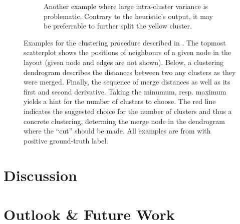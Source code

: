 \documentclass[
	fontsize=10pt, %
	twoside=false, %
	secnumdepth=1, %
  toc=indentunnumbered %
]{kaobook}
\begin{document}
\begin{figure}[h]
\begin{subfigure}{0.48\linewidth}
        \caption{Another example where large intra-cluster variance is
          problematic. Contrary to the heuristic's output, it may be preferrable
          to further split the yellow cluster.}
      \end{subfigure}
      \caption[
      Example outputs of the heuristic for attaching edges after node
      duplication has been decided.
      ]
      {
    Examples for the clustering procedure described in . The topmost scatterplot shows the positions of neighbours
    of a given node in the layout (given node and edges are not shown). Below, a clustering dendrogram describes
    the distances between two any clusters as they were merged. Finally, the
    sequence of merge distances as well as its first and second derivative.
    Taking the minumum, resp. maximum yields a hint for the number of clusters
    to choose. The red line indicates the suggested choice for the number of
    clusters and thus a concrete clustering, determing the merge node in the
    dendrogram where the ``cut'' should be made.
    All examples are from \ADLast{} with positive ground-truth label.}
  \label{fig:neighb-clust-examples}
\end{figure}


\chapter{Discussion}
\label{sec:discussion}





\chapter{Outlook \& Future Work}
\label{sec:future-work}




\end{document}
